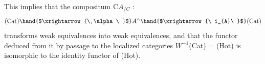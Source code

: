 This implies that the compositum  C\hand{$\mapsto$}$A_{/C}$  :
\[ (\mathrm{Cat}) \hand{$\xrightarrow{\ \alpha\ }$} A^\wedge \hand{$\xrightarrow{\ i_{A}\ }$} (\mathrm{Cat}) \]
transforms weak equivalences into weak equivalences,  and that the functor
deduced from it by passage to the localized categories  $W^{-1}$(Cat) = (Hot)
is isomorphic to the identity functor of (Hot).
